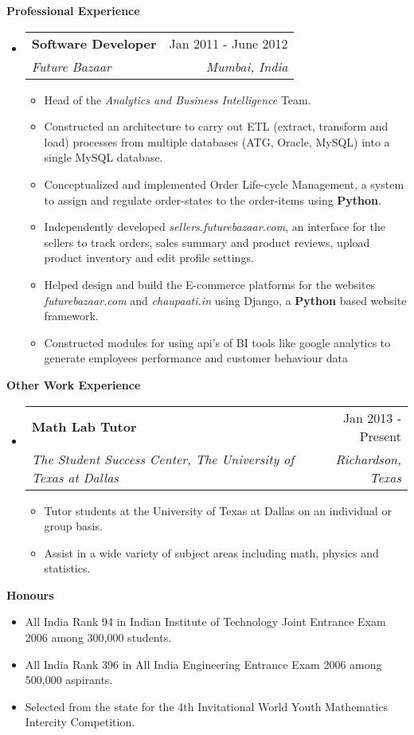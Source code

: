 \documentclass[letterpaper,11pt]{article}
\makeatletter
\newcommand{\resitem}[1]{\item[\ding{226}] #1 \vspace{-2pt}}
\newcommand{\resheading}[1]{{\large \colorbox{mygrey}{\begin{minipage}{\textwidth}{\textbf{#1 \vphantom{p\^{E}}}}\end{minipage}}}}
\newcommand{\ressubheading}[4]{
\begin{tabular*}{7.0in}{l@{\extracolsep{\fill}}r}
		\textbf{#1} & #2 \\
		\textit{#3} & \textit{#4} \\
\end{tabular*}\vspace{-6pt}}
\makeatother
\begin{document}
\resheading{Professional Experience}
\begin{itemize}
\item
	\ressubheading{Software Developer}{Jan 2011 - June 2012}{Future Bazaar}{Mumbai, India}
	\begin{itemize}
		\resitem{Head of the \textit{Analytics and Business Intelligence} Team. }
		\resitem{Constructed an architecture to carry out ETL (extract, transform and load) processes from multiple databases (ATG, Oracle, MySQL) into a single MySQL database.}
		\resitem{Conceptualized and implemented Order Life-cycle Management, a system to assign and regulate order-states to the order-items using \textbf{Python}.}
		\resitem{Independently developed \textit{sellers.futurebazaar.com}, an interface for the sellers to track orders, sales summary and product reviews, upload product inventory and edit profile settings.}
		\resitem{Helped design and build the E-commerce platforms for the websites \textit{futurebazaar.com} and \textit{chaupaati.in} using Django, a \textbf{Python} based website framework.}
		\resitem{Constructed modules for using api's of BI tools like google analytics to generate employees performance and customer behaviour data}
	\end{itemize}
\end{itemize}

\resheading{Other Work Experience}
\begin{itemize}

\item
	\ressubheading{Math Lab Tutor}{Jan 2013 - Present}{The Student Success Center, The University of Texas at Dallas}{Richardson, Texas} 
	\begin{itemize}
		\resitem{Tutor students at the University of Texas at Dallas on an individual or group basis.}
        \resitem{Assist in a wide variety of subject areas including math, physics and statistics.}
	\end{itemize}

\end{itemize}

\resheading{Honours}
\begin{itemize}

\item{All India Rank 94 in Indian Institute of Technology Joint Entrance Exam 2006 among 300,000 students.}
\item{All India Rank 396 in All India Engineering Entrance Exam 2006 among 500,000 aspirants.}
\item{Selected from the state for the 4th Invitational World Youth Mathematics Intercity Competition.}

\end{itemize}
\end{document}
